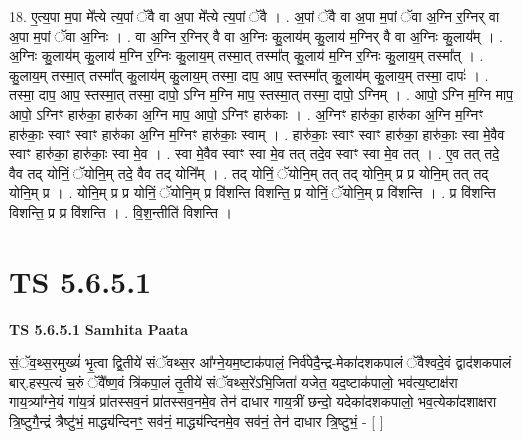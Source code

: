 \documentclass[17pt]{extarticle}
\begin{document}
18. ए॒त्य॒पा म॒पा मे᳚त्ये त्य॒पां ॅवै वा अ॒पा मे᳚त्ये त्य॒पां ॅवै । . अ॒पां ॅवै वा अ॒पा म॒पां ॅवा अ॒ग्नि र॒ग्निर् वा अ॒पा म॒पां ॅवा अ॒ग्निः । . वा अ॒ग्नि र॒ग्निर् वै वा अ॒ग्निः कु॒लाय॑म् कु॒लाय॑ म॒ग्निर् वै वा अ॒ग्निः कु॒लाय᳚म् । . अ॒ग्निः कु॒लाय॑म् कु॒लाय॑ म॒ग्नि र॒ग्निः कु॒लाय॒म् तस्मा॒त् तस्मा᳚त् कु॒लाय॑ म॒ग्नि र॒ग्निः कु॒लाय॒म् तस्मा᳚त् । . कु॒लाय॒म् तस्मा॒त् तस्मा᳚त् कु॒लाय॑म् कु॒लाय॒म् तस्मा॒ दाप॒ आप॒ स्तस्मा᳚त् कु॒लाय॑म् कु॒लाय॒म् तस्मा॒ दापः॑ । . तस्मा॒ दाप॒ आप॒ स्तस्मा॒त् तस्मा॒ दापो॒ ऽग्नि म॒ग्नि माप॒ स्तस्मा॒त् तस्मा॒ दापो॒ ऽग्निम् । . आपो॒ ऽग्नि म॒ग्नि माप॒ आपो॒ ऽग्निꣳ हारु॑का॒ हारु॑का अ॒ग्नि माप॒ आपो॒ ऽग्निꣳ हारु॑काः । . अ॒ग्निꣳ हारु॑का॒ हारु॑का अ॒ग्नि म॒ग्निꣳ हारु॑काः॒ स्वाꣳ स्वाꣳ हारु॑का अ॒ग्नि म॒ग्निꣳ हारु॑काः॒ स्वाम् । . हारु॑काः॒ स्वाꣳ स्वाꣳ हारु॑का॒ हारु॑काः॒ स्वा मे॒वैव स्वाꣳ हारु॑का॒ हारु॑काः॒ स्वा मे॒व । . स्वा मे॒वैव स्वाꣳ स्वा मे॒व तत् तदे॒व स्वाꣳ स्वा मे॒व तत् । . ए॒व तत् तदे॒ वैव तद् योनिं॒ ॅयोनि॒म् तदे॒ वैव तद् योनि᳚म् । . तद् योनिं॒ ॅयोनि॒म् तत् तद् योनि॒म् प्र प्र योनि॒म् तत् तद् योनि॒म् प्र । . योनि॒म् प्र प्र योनिं॒ ॅयोनि॒म् प्र वि॑शन्ति विशन्ति॒ प्र योनिं॒ ॅयोनि॒म् प्र वि॑शन्ति । . प्र वि॑शन्ति विशन्ति॒ प्र प्र वि॑शन्ति । . वि॒श॒न्तीति॑ विशन्ति । \newline
\pagebreak
{}

\section{ TS 5.6.5.1 }

\textbf{TS 5.6.5.1 } \newline
\textbf{Samhita Paata} \newline

सं॒ॅव॒थ्स॒रमुख्यं॑ भृ॒त्वा द्वि॒तीये॑ संॅवथ्स॒र आ᳚ग्ने॒यम॒ष्टाक॑पालं॒ निर्व॑पेदै॒न्द्र-मेका॑दशकपालं ॅवैश्वदे॒वं द्वाद॑शकपालं बार्.हस्प॒त्यं च॒रुं ॅवै᳚ष्ण॒वं त्रि॑कपा॒लं तृ॒तीये॑ संॅवथ्स॒रे॑ऽभि॒जिता॑ यजेत॒ यद॒ष्टाक॑पालो॒ भव॑त्य॒ष्टाक्ष॑रा गाय॒त्र्या᳚ग्ने॒यं गा॑य॒त्रं प्रा॑तस्सव॒नं प्रा॑तस्सव॒नमे॒व तेन॑ दाधार गाय॒त्रीं छन्दो॒ यदेका॑दशकपालो॒ भव॒त्येका॑दशाक्षरा त्रि॒ष्टुगै॒न्द्रं त्रैष्टु॑भं॒ माद्ध्य॑न्दिनꣳ॒॒ सव॑नं॒ माद्ध्य॑न्दिनमे॒व सव॑नं॒ तेन॑ दाधार त्रि॒ष्टुभं॒ - [  ] \newline
\end{document}
